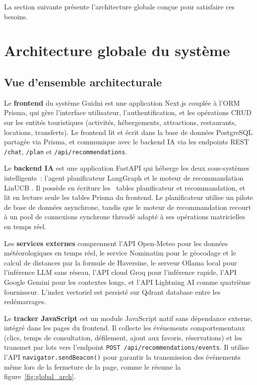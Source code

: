 La section suivante présente l'architecture globale conçue pour satisfaire ces besoins.


\section{Architecture globale du système}

\subsection{Vue d'ensemble architecturale}

Le \textbf{frontend} du système Guidni est une application Next.js couplée à l'ORM Prisma, qui
gère l'interface utilisateur, l'authentification, et les opérations CRUD sur les entités
touristiques (activités, hébergements, attractions, restaurants, locations, transferts). Le frontend lit et
écrit dans la base de données PostgreSQL partagée via Prisma, et communique avec le backend IA
via les endpoints REST \texttt{/chat}, \texttt{/plan} et \texttt{/api/recommendations}.

Le \textbf{backend IA} est une application FastAPI qui héberge les deux sous-systèmes
intelligents~: l'agent planificateur LangGraph et le moteur de recommandation
LinUCB . Il possède en écriture les ~tables planificateur et 
recommandation, et lit en lecture seule les tables Prisma du frontend. Le planificateur utilise
un pilote de base de données asynchrone, tandis que le moteur de recommandation recourt à un pool
de connexions synchrone threadé adapté à ses opérations matricielles en temps réel.

Les \textbf{services externes} comprennent l'API Open-Meteo pour les données météorologiques
en temps réel, le service Nominatim pour le géocodage et le calcul de distances par la formule
de Haversine, le serveur Ollama local pour l'inférence LLM sans réseau, l'API cloud Groq pour
l'inférence rapide, l'API Google Gemini pour les contextes longs, et l'API Lightning AI comme
quatrième fournisseur. L'index vectoriel est persisté sur Qdrant database entre les redémarrages.

Le \textbf{tracker JavaScript} est un module JavaScript natif sans dépendance externe, intégré dans
les pages du frontend. Il collecte les événements comportementaux (clics, temps de consultation,
défilement, ajout aux favoris, réservations) et les transmet par lots vers l'endpoint
\texttt{POST /api/recommendations/events}. Il utilise l'API \texttt{navigator.sendBeacon()} pour
garantir la transmission des événements même lors de la fermeture de la page, comme le résume la figure~\ref{fig:global_arch}.

